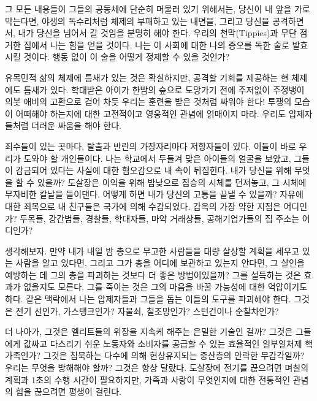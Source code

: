 \documentclass[10pt, b6paper, openany]{memoir}
\begin{document}
\begin{article}
그 모든 내용들이 그들의 공동체에 단순히 머물러 있기 위해서는, 당신이 내 앞을 가로막는다면, 야생의 독수리처럼 체제의 부패하고 있는 내면을, 그리고 당신을 공격하면서, 내가 당신을 넘어서 갈 것임을 분명히 해야 한다. 우리의 천막(Tippies)과 무단 점거한 집에서 나는 힘을 얻을 것이다. 나는 이 사회에 대한 나의 증오를 독한 술로 발효시킬 것이다. 행동 없이 이 술을 어떻게 정제할 수 있을 것인가? 

유목민적 삶의 체제에 틈새가 있는 것은 확실하지만, 공격할 기회를 제공하는 현 체제에도 틈새가 있다. 학대받은 아이가 한밤의 숲으로 도망가기 전에 주저없이 주정뱅이 의붓 애비의 고환으로 걷어 차듯 우리는 훈련을 받은 것처럼 싸워야 한다! 투쟁의 모습이 어떠해야 하는지에 대한 고전적이고 영웅적인 관념에 얽매이지 마라. 우리도 압제자들처럼 더러운 싸움을 해야 한다. 

죄수들이 있는 곳마다, 탈출과 반란의 가장자리마다 저항자들이 있다. 이들이 바로 우리가 도와야 할 개인들이다. 나는 학교에서 두들겨 맞은 아이들의 얼굴을 보았고, 그들이 감금되어 있다는 사실에 대한 혐오감으로 내 속이 뒤집힌다. 내가 당신을 위해 무엇을 할 수 있을까? 도살장은 이익을 위해 밤낮으로 짐승의 시체를 던져놓고, 그 시체에 무자비한 칼날을 들이댄다. 어떻게 하면 내가 당신의 고통을 끝낼 수 있을까? 자유에 대한 죄목으로 내 친구들은 국가에 의해 수감되었다. 감옥의 가장 약한 지점은 어디인가? 두목들, 강간범들, 경찰들, 학대자들, 마약 거래상들, 공해기업가들의 집 주소는 어디인가?

생각해보자. 만약 내가 내일 밤 총으로 무고한 사람들을 대량 살상할 계획을 세우고 있는 사람을 알고 있다면, 그리고 그가 총을 어디에 보관하고 있는지 안다면, 그 살인을 예방하는 데 그의 총을 파괴하는 것보다 더 좋은 방법이있을까? 그를 설득하는 것은 효과가 없을지도 모른다. 그를 죽이는 것은 그의 마음을 바꿀 가능성에 대한 억압이기도 하다. 같은 맥락에서 나는 압제자들과 그들을 돕는 이들의 도구를 파괴해야 한다. 그것은 전기 선인가, 가스탱크인가? 자물쇠, 철조망인가? 스턴건이나 순찰차인가?  

더 나아가, 그것은 엘리트들의 위장을 지속케 해주는 은밀한 기술인 걸까? 그것은 그들에게 값싸고 다스리기 쉬운 노동자와 소비자를 공급할 수 있는 효율적인 일부일처제 핵가족인가? 그것은 침묵하는 다수에 의해 현상유지되는 중산층의 안락한  무감각일까? 우리는 무엇을 방해해야 할까? 그것은 항상 달랐다. 도살장에 전기를 끊으려면 며칠의 계획과 1초의 수행 시간이 필요하지만, 가족과 사랑이 무엇인지에 대한 전통적인 관념의 힘을 끊으려면 평생이 걸린다. 


\end{article}
\end{document}
